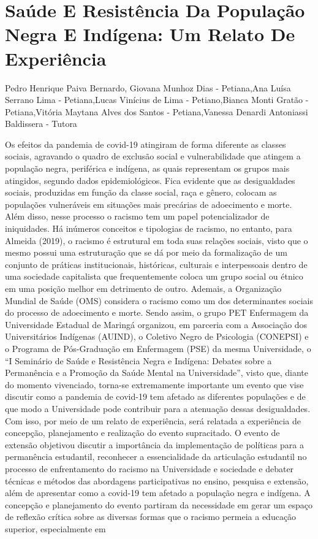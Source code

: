 


\section*{Saúde E Resistência Da População Negra E Indígena: Um Relato De Experiência}

Pedro Henrique Paiva Bernardo, Giovana Munhoz Dias - Petiana,Ana Luísa Serrano Lima - Petiana,Lucas Vinícius de Lima - Petiano,Bianca Monti Gratão - Petiana,Vitória Maytana Alves dos Santos - Petiana,Vanessa Denardi Antoniassi Baldissera - Tutora

Os efeitos da pandemia de covid-19 atingiram de forma diferente as classes sociais, agravando o quadro de exclusão social e vulnerabilidade que atingem a população negra, periférica e indígena, as quais representam os grupos mais atingidos, segundo dados epidemiológicos. Fica evidente que as desigualdades sociais, produzidas em função da classe social, raça e gênero, colocam as populações vulneráveis em situações mais precárias de adoecimento e morte. Além disso, nesse processo o racismo tem um papel potencializador de iniquidades. Há inúmeros conceitos e tipologias de racismo, no entanto, para Almeida (2019), o racismo é estrutural em toda suas relações sociais, visto que o mesmo possui uma estruturação que se dá por meio da formalização de um conjunto de práticas institucionais, históricas, culturais e interpessoais dentro de uma sociedade capitalista que frequentemente coloca um grupo social ou étnico em uma posição melhor em detrimento de outro. Ademais, a Organização Mundial de Saúde (OMS) considera o racismo como um dos determinantes sociais do processo de adoecimento e morte. Sendo assim, o grupo PET Enfermagem da Universidade Estadual de Maringá organizou, em parceria com a Associação dos Universitários Indígenas (AUIND), o Coletivo Negro de Psicologia (CONEPSI) e o Programa de Pós-Graduação em Enfermagem (PSE) da mesma Universidade, o “I Seminário de Saúde e Resistência Negra e Indígena: Debates sobre a Permanência e a Promoção da Saúde Mental na Universidade”, visto que, diante do momento vivenciado, torna-se extremamente importante um evento que vise discutir como a pandemia de covid-19 tem afetado as diferentes populações e de que modo a Universidade pode contribuir para a atenuação dessas desigualdades. Com isso, por meio de um relato de experiência, será relatada a experiência de concepção, planejamento e realização do evento supracitado. O evento de extensão objetivou discutir a importância da implementação de políticas para a permanência estudantil, reconhecer a essencialidade da articulação estudantil no processo de enfrentamento do racismo na Universidade e sociedade e debater técnicas e métodos das abordagens participativas no ensino, pesquisa e extensão, além de apresentar como a covid-19 tem afetado a população negra e indígena. A concepção e planejamento do evento partiram da necessidade em gerar um espaço de reflexão crítica sobre as diversas formas que o racismo permeia a educação superior, especialmente em 